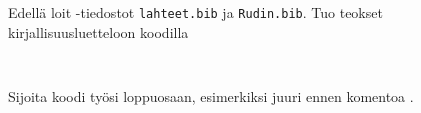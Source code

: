     \begin{harj}
        Edellä loit \BibTeX-tiedostot \verb-lahteet.bib- ja \verb-Rudin.bib-. Tuo teokset kirjallisuusluetteloon koodilla 
        \begin{Verbatim}[frame=single]


        \end{Verbatim}
        Sijoita koodi työsi loppuosaan, esimerkiksi juuri ennen komentoa \verb--.
    \end{harj}
